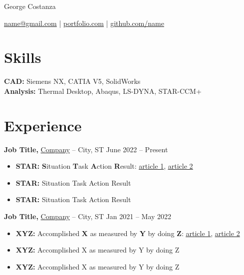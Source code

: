 \documentclass[11pt]{article}       %
\begin{document}
\centerline{\Huge George Costanza}

\vspace{5pt}

\centerline{\href{mailto:name@gmail.com}{name@gmail.com} | \href{https://mitcommlab.mit.edu/meche/commkit/portfolio/}{portfolio.com} | \href{https://old.reddit.com/r/EngineeringResumes/wiki/index\#wiki_portfolios}{github.com/name}}

\vspace{-10pt}

\section*{Skills}
\textbf{CAD:} Siemens NX, CATIA V5, SolidWorks \\
\textbf{Analysis:} Thermal Desktop, Abaqus, LS-DYNA, STAR-CCM+

\vspace{-6.5pt}

\section*{Experience}
\textbf{Job Title,} \href{https://www.fstl1992.com/}{Company} -- City, ST \hfill June 2022 -- Present \\
\vspace{-9pt}
\begin{itemize}
  \item \textbf{STAR:} \textbf{S}ituation \textbf{T}ask \textbf{A}ction \textbf{R}esult: \href{https://www.levels.fyi/blog/applying-star-method-resumes.html}{\underline{article 1}}, \href{https://resumegenius.com/blog/resume-help/star-method-resume}{\underline{article 2}}
  \item \textbf{STAR:} Situation Task Action Result
  \item \textbf{STAR:} Situation Task Action Result
\end{itemize}

\textbf{Job Title,} \href{https://www.fstl1992.com/}{Company} -- City, ST \hfill Jan 2021 -- May 2022 \\
\vspace{-9pt}
\begin{itemize}
  \item \textbf{XYZ:} Accomplished \textbf{X} as measured by \textbf{Y} by doing \textbf{Z}: \href{https://www.inc.com/bill-murphy-jr/google-recruiters-say-these-5-resume-tips-including-x-y-z-formula-will-improve-your-odds-of-getting-hired-at-google.html}{\underline{article 1}}, \href{https://elevenrecruiting.com/create-an-effective-resume-xyz-resume-format/}{\underline{article 2}}
  \item \textbf{XYZ:} Accomplished X as measured by Y by doing Z
  \item \textbf{XYZ:} Accomplished X as measured by Y by doing Z
\end{itemize}
\end{document}

